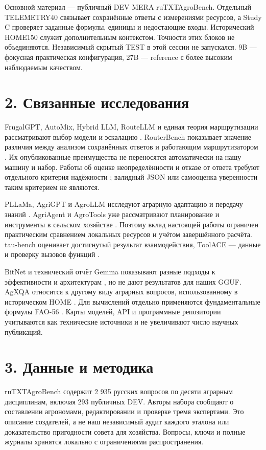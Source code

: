 \documentclass[14pt,a4paper]{extarticle}
\begin{document}
Основной материал --- публичный DEV MERA ruTXTAgroBench. Отдельный TELEMETRY40 связывает сохранённые ответы с измерениями ресурсов, а Study C проверяет заданные формулы, единицы и недостающие входы. Исторический HOME150 служит дополнительным контекстом. Точности этих блоков не объединяются. Независимый скрытый TEST в этой сессии не запускался. 9B --- фокусная практическая конфигурация, 27B --- reference с более высоким наблюдаемым качеством.


\section*{2. Связанные исследования}

FrugalGPT, AutoMix, Hybrid LLM, RouteLLM и единая теория маршрутизации рассматривают выбор модели и эскалацию \cite{ref1,ref2,ref3,ref4,ref5}. RouterBench показывает значение различия между анализом сохранённых ответов и работающим маршрутизатором \cite{ref6}. Их опубликованные преимущества не переносятся автоматически на нашу машину и набор. Работы об оценке неопределённости и отказе от ответа требуют отдельного критерия надёжности \cite{ref7,ref8}; валидный JSON или самооценка уверенности таким критерием не являются.


PLLaMa, AgriGPT и AgroLLM исследуют аграрную адаптацию и передачу знаний \cite{ref9,ref10,ref11}. AgriAgent и AgroTools уже рассматривают планирование и инструменты в сельском хозяйстве \cite{ref12,ref13}. Поэтому вклад настоящей работы ограничен практическим сравнением локальных ресурсов и учётом завершённого расчёта. tau-bench оценивает достигнутый результат взаимодействия, ToolACE --- данные и проверку вызовов функций \cite{ref14,ref15}.


BitNet и технический отчёт Gemma показывают разные подходы к эффективности и архитектурам \cite{ref16,ref17}, но не дают результатов для наших GGUF. AgXQA относится к другому виду аграрных вопросов, использованному в историческом HOME \cite{ref18}. Для вычислений отдельно применяются фундаментальные формулы FAO-56 \cite{ref19}. Карты моделей, API и программные репозитории учитываются как технические источники и не увеличивают число научных публикаций.


\section*{3. Данные и методика}

ruTXTAgroBench содержит 2 935 русских вопросов по десяти аграрным дисциплинам, включая 293 публичных DEV. Авторы набора сообщают о составлении агрономами, редактировании и проверке тремя экспертами. Это описание создателей, а не наш независимый аудит каждого эталона или доказательство пригодности совета для хозяйства. Вопросы, ключи и полные журналы хранятся локально с ограничениями распространения.
\end{document}
